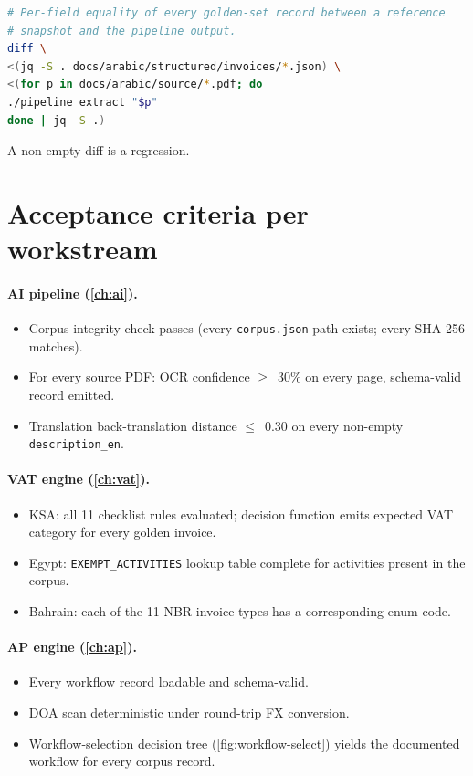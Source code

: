 \documentclass[11pt,a4paper,twoside]{report}
\begin{document}
\begin{lstlisting}[language=bash,basicstyle=\ttfamily\small]
# Per-field equality of every golden-set record between a reference
# snapshot and the pipeline output.
diff \
<(jq -S . docs/arabic/structured/invoices/*.json) \
<(for p in docs/arabic/source/*.pdf; do
./pipeline extract "$p"
done | jq -S .)
\end{lstlisting}

A non-empty diff is a regression.

\section{Acceptance criteria per workstream}

\paragraph{AI pipeline (\cref{ch:ai}).}
\begin{itemize}
\item Corpus integrity check passes (every \texttt{corpus.json} path
exists; every SHA-256 matches).
\item For every source PDF: OCR confidence $\geq$~30\% on every page,
schema-valid record emitted.
\item Translation back-translation distance $\leq$~0.30 on every
non-empty \texttt{description\_en}.
\end{itemize}

\paragraph{VAT engine (\cref{ch:vat}).}
\begin{itemize}
\item KSA: all 11 checklist rules evaluated; decision function
emits expected VAT category for every golden invoice.
\item Egypt: \texttt{EXEMPT\_ACTIVITIES} lookup table complete for
activities present in the corpus.
\item Bahrain: each of the 11 NBR invoice types has a corresponding
enum code.
\end{itemize}

\paragraph{AP engine (\cref{ch:ap}).}
\begin{itemize}
\item Every workflow record loadable and schema-valid.
\item DOA scan deterministic under round-trip FX conversion.
\item Workflow-selection decision tree (\cref{fig:workflow-select})
yields the documented workflow for every corpus record.
\end{itemize}
\end{document}
